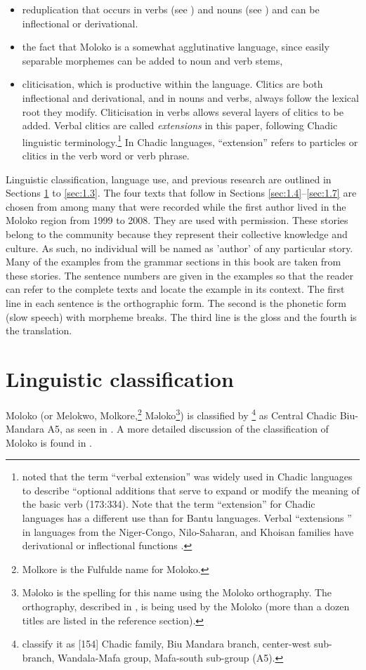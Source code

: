 \begin{itemize}
\item reduplication that occurs in verbs (see ) and nouns (see ) and can be inflectional or derivational.  
\item the fact that Moloko is a somewhat agglutinative language, since easily separable morphemes can be added to noun and verb stems,
\item cliticisation, which is productive within the language. Clitics are both inflectional and derivational, and in nouns and verbs, always follow the lexical root they modify. Cliticisation in verbs allows several layers of clitics to be added. Verbal clitics are called \textit{extensions} in this paper, following Chadic linguistic terminology.\footnote{\citet{Newman1973} noted that the term ``verbal extension'' was widely used in Chadic languages to describe “optional additions that serve to expand or modify the meaning of the basic verb (173:334). Note that the term ``extension'' for Chadic languages has a different use than for Bantu languages. Verbal ``extensions '' in languages from the Niger-Congo, Nilo-Saharan, and Khoisan families have derivational or inflectional functions \citep{Hyman2007}. } In Chadic languages, ``extension'' refers to particles or clitics in the verb word or verb phrase.
\end{itemize}

Linguistic classification, language use, and previous research are outlined in Sections \ref{sec:1.1} to \ref{sec:1.3}. The four texts that follow in Sections \ref{sec:1.4}--\ref{sec:1.7} are chosen from among many that were recorded while the first author lived in the Moloko region from 1999 to 2008. They are used with permission. These stories belong to the community because they represent their collective knowledge and culture. As such, no individual will be named as 'author' of any particular story. Many of the examples from the grammar sections in this book are taken from these stories. The sentence numbers are given in the examples so that the reader can refer to the complete texts and locate the example in its context. The first line in each sentence is the orthographic form. The second is the phonetic form (slow speech) with morpheme breaks. The third line is the gloss and the fourth is the translation.

\section{Linguistic classification}\label{sec:1.1}
\hypertarget{RefHeading1210261525720847}{}
Moloko (or Melokwo, Molkore,\footnote{Molkore is the Fulfulde name for Moloko.} Məloko\footnote{Məloko is the spelling for this name using the Moloko orthography. The orthography, described in \citet{Friesen2001}, is being used by the Moloko (more than a dozen titles are listed in the reference section).}) is classified by \citet{LewisSimonsFennig2009}\footnote{\citet{DieuRenaud1983} classify it as [154] Chadic family, Biu Mandara branch, center-west sub-branch, Wandala-Mafa group, Mafa-south sub-group (A5).} as Central Chadic Biu-Mandara A5, as seen in . A more detailed discussion of the classification of Moloko is found in \citet{Bow1997a}. 

